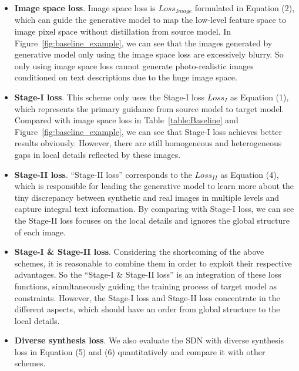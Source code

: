 \documentclass[sigconf]{acmart}
\begin{document}
\begin{itemize}
	\item {\bf Image space loss}. 
	Image space loss is $Loss_{Image}$ formulated in Equation (2), which can guide the generative model to map the low-level feature space to image pixel space without distillation from source model. In Figure~\ref{fig:baseline_example}, we can see that the images generated by generative model only using the image space loss are excessively blurry. So only using image space loss cannot generate photo-realistic images conditioned on text descriptions due to the huge image space.
	
	\item {\bf Stage-I loss}. 
	This scheme only uses the Stage-I loss $Loss_I$ as Equation (1), which represents the primary guidance from source model to target model. Compared with image space loss in Table~\ref{table:Baseline} and Figure~\ref{fig:baseline_example}, we can see that Stage-I loss achieves better results obviously. However, there are still homogeneous and heterogeneous gaps in local details reflected by these images.
	
	\item {\bf Stage-II loss}. 
	``Stage-II loss'' corresponds to the $Loss_{II}$ as Equation (4), which is responsible for leading the generative model to learn more about the tiny discrepancy between synthetic and real images in multiple levels and capture integral text information. By comparing with Stage-I loss, we can see the Stage-II loss focuses on the local details and ignores the global structure of each image.
	
	\item {\bf Stage-I \& Stage-II loss}. 
	Considering the	shortcoming of the above schemes, it is reasonable to combine them in order to exploit their respective advantages. So the ``Stage-I \& Stage-II loss'' is an integration of these loss functions, simultaneously guiding the training process of target model as constraints. However, the Stage-I loss and Stage-II loss concentrate in the different aspects, which should have an order from global structure to the local details. 
	
	\item {\bf Diverse synthesis loss}. 
	We also evaluate the SDN with diverse synthesis loss in Equation (5) and (6) quantitatively and compare it with other schemes. 
	
\end{itemize}
\end{document}

